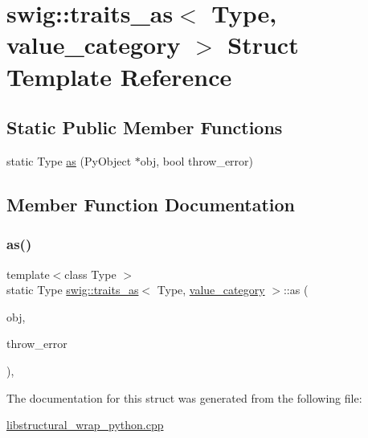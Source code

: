 \hypertarget{structswig_1_1traits__as_3_01_type_00_01value__category_01_4}{}\section{swig\+:\+:traits\+\_\+as$<$ Type, value\+\_\+category $>$ Struct Template Reference}
\label{structswig_1_1traits__as_3_01_type_00_01value__category_01_4}
\subsection*{Static Public Member Functions}
\begin{DoxyCompactItemize}
\item 
static Type \hyperlink{structswig_1_1traits__as_3_01_type_00_01value__category_01_4_addd7e404759a0808fa9f342f7a0f887b}{as} (Py\+Object $\ast$obj, bool throw\+\_\+error)
\end{DoxyCompactItemize}


\subsection{Member Function Documentation}
\mbox{\label{structswig_1_1traits__as_3_01_type_00_01value__category_01_4_addd7e404759a0808fa9f342f7a0f887b}} 
\subsubsection{\texorpdfstring{as()}{as()}}
{\footnotesize\ttfamily template$<$class Type $>$ \\
static Type \hyperlink{structswig_1_1traits__as}{swig\+::traits\+\_\+as}$<$ Type, \hyperlink{structswig_1_1value__category}{value\+\_\+category} $>$\+::as (\begin{DoxyParamCaption}\item[{Py\+Object $\ast$}]{obj,  }\item[{bool}]{throw\+\_\+error }\end{DoxyParamCaption})\hspace{0.3cm}{\ttfamily [inline]}, {\ttfamily [static]}}



The documentation for this struct was generated from the following file\+:\begin{DoxyCompactItemize}
\item 
\hyperlink{libstructural__wrap__python_8cpp}{libstructural\+\_\+wrap\+\_\+python.\+cpp}\end{DoxyCompactItemize}
